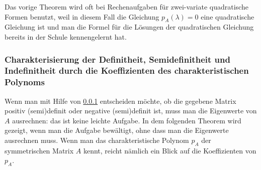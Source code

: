 Das vorige Theorem wird oft bei Rechenaufgaben für zwei-variate quadratische Formen benutzt, weil in diesem Fall die Gleichung $p_A(\lambda) = 0$ eine quadratische Gleichung ist und man die Formel für die Lösungen der quadratischen Gleichung bereits in der Schule kennengelernt hat. 

\subsubsection{Charakterisierung der Definitheit, Semidefinitheit und Indefinitheit durch die Koeffizienten des charakteristischen Polynoms}
\label{sec:7_3_7}

Wenn man mit Hilfe von \ref{sec:7_3_7} entscheiden möchte, ob die gegebene Matrix positiv (semi)definit oder negative (semi)definit ist, muss man die Eigenwerte von $A$ ausrechnen: das ist keine leichte Aufgabe. In dem folgenden Theorem wird gezeigt, wenn man die Aufgabe bewältigt, ohne dass man die Eigenwerte ausrechnen muss. Wenn man das charakteristische Polynom $p_A$ der symmetrischen Matrix $A$ kennt, reicht nämlich ein Blick auf die Koeffizienten von $p_A$. 


